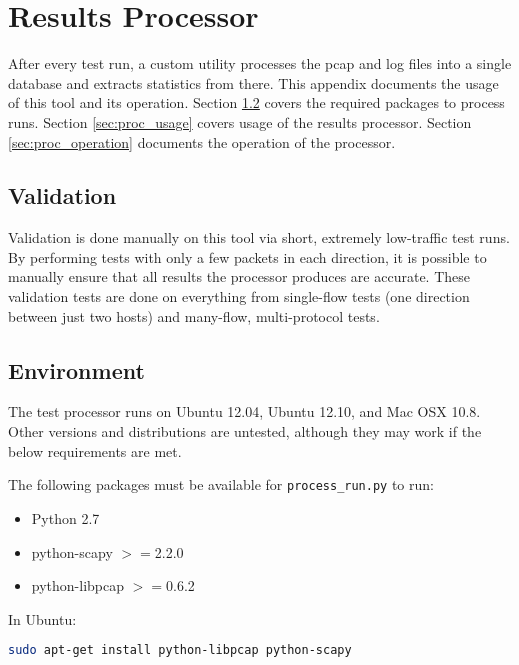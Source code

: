 \chapter{Results Processor}
\label{chp:processor}

\par After every test run, a custom utility processes the pcap and log files into a single database and extracts statistics from there. This appendix documents the usage of this tool and its operation. Section \ref{sec:proc_env} covers the required packages to process runs. Section \ref{sec:proc_usage} covers usage of the results processor. Section \ref{sec:proc_operation} documents the operation of the processor.

\section{Validation}
\par Validation is done manually on this tool via short, extremely low-traffic test runs. By performing tests with only a few packets in each direction, it is possible to manually ensure that all results the processor produces are accurate. These validation tests are done on everything from single-flow tests (one direction between just two hosts) and many-flow, multi-protocol tests.

\section{Environment}
\label{sec:proc_env}
\par The test processor runs on Ubuntu 12.04, Ubuntu 12.10, and Mac OSX 10.8. Other versions and distributions are untested, although they may work if the below requirements are met. 

\par The following packages must be available for \texttt{process\_run.py} to run:
{\singlespace
\begin{itemize}
\item Python 2.7
\item python-scapy $>=$2.2.0
\item python-libpcap $>=$0.6.2
\end{itemize}
}

\par In Ubuntu:
\begin{lstlisting}[language=bash]
sudo apt-get install python-libpcap python-scapy
\end{lstlisting}

